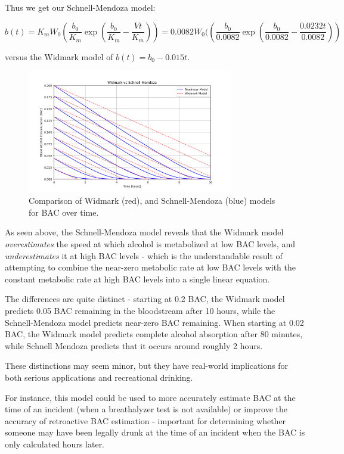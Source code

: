 \documentclass[12pt]{article}
\begin{document}
Thus we get our Schnell-Mendoza model:

\[
b(t) = K_mW_0\left(\frac{b_0}{K_m}\exp\left(\frac{b_0}{K_m} - \frac{Vt}{K_m}\right)\right)
= 
0.0082W_0(\left(\frac{b_0}{0.0082}\exp\left(\frac{b_0}{0.0082} - \frac{0.0232t}{0.0082}\right)\right)
\]

versus the Widmark model of $b(t) = b_0 - 0.015t$.

\begin{figure}[H]
\centering
\includegraphics[width=0.8\textwidth]{comparison-schnellmendoza-widmark.png}
\caption{Comparison of Widmark (red), and Schnell-Mendoza (blue) models for BAC over time.}
\label{fig:comparison}
\end{figure}

As seen above, the Schnell-Mendoza model reveals that the Widmark model \textit{overestimates} the speed at which alcohol is metabolized at low BAC levels, and \textit{underestimates} it at high BAC levels - which is the understandable result of attempting to combine the near-zero metabolic rate at low BAC levels with the constant metabolic rate at high BAC levels into a single linear equation. 

The differences are quite distinct - starting at 0.2 BAC, the Widmark model predicts 0.05 BAC remaining in the bloodstream after 10 hours, while the Schnell-Mendoza model predicts near-zero BAC remaining. When starting at 0.02 BAC, the Widmark model predicts complete alcohol absorption after 80 minutes, while Schnell Mendoza predicts that it occurs around roughly 2 hours.

These distinctions may seem minor, but they have real-world implications for both serious applications and recreational drinking.

For instance, this model could be used to more accurately estimate BAC at the time of an incident (when a breathalyzer test is not available) or improve the accuracy of retroactive BAC estimation - important for determining whether someone may have been legally drunk at the time of an incident when the BAC is only calculated hours later. 
\end{document}
